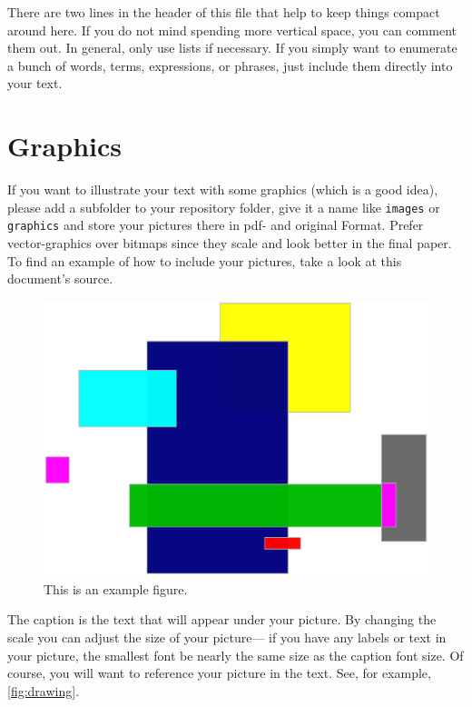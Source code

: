 \documentclass{acm_proc_article-sp}
\begin{document}
There are two lines in the header of this file
that help to keep things compact around here.
If you do not mind spending more vertical space,
you can comment them out.
In general,
only use lists if necessary.
If you simply want to enumerate a bunch of
words, terms, expressions, or phrases,
just include them directly into your text.


\section{Graphics}

If you want to illustrate your text with some graphics
(which is a good idea),
please add a subfolder to your repository folder,
give it a name like \texttt{images} or \texttt{graphics}
and store your pictures there
in pdf- and original Format.
Prefer vector-graphics over bitmaps
since they scale and look better
in the final paper.
To find an example of how to include your pictures,
take a look at this document's source.

\begin{figure}
  \centering
  \includegraphics[scale=0.2]{drawing}
  \caption{This is an example figure.}
  \label{fig:drawing}
\end{figure}

The caption is the text
that will appear under your picture.
By changing the scale
you can adjust the size of your picture---%
if you have any labels or text in your picture,
the smallest font be nearly the same size as the caption font size.
Of course,
you will want to reference your picture in the text.
See, for example, \autoref{fig:drawing}.
\end{document}
